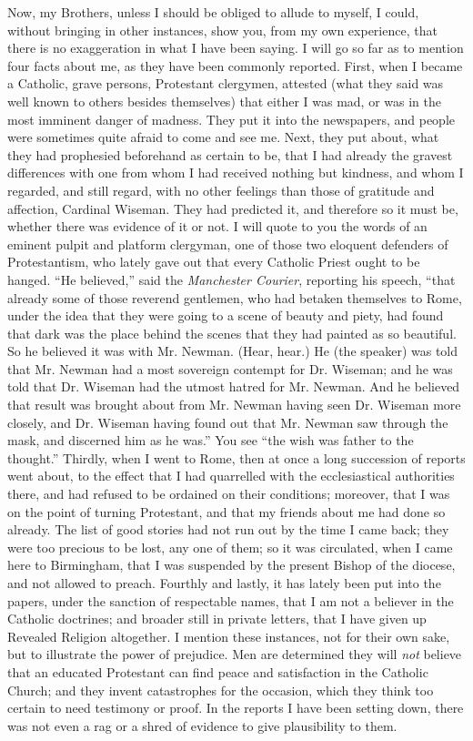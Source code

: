 Now, my Brothers, unless I should be obliged to allude
to myself, I could, without bringing in other instances,
show you, from my own experience, that there is no
exaggeration in what I have been saying. I will go so far
as to mention four facts about me, as they have been
commonly reported. First, when I became a Catholic, grave
persons, Protestant clergymen, attested (what they said
was well known to others besides themselves) that either
I was mad, or was in the most imminent danger of madness.
They put it into the newspapers, and people were
sometimes quite afraid to come and see me. Next, they put
about, what they had prophesied beforehand as certain to
be, that I had already the gravest differences with one
from whom I had received nothing but kindness, and whom I
regarded, and still regard, with no other feelings than
those of gratitude and affection, Cardinal Wiseman. They
had predicted it, and therefore so it must be, whether
there was evidence of it or not. I will quote to you the
words of an eminent pulpit and platform clergyman, one of
those two eloquent defenders of Protestantism, who lately
gave out that every Catholic Priest ought to be hanged.
``He believed,'' said the \emph{Manchester Courier},
reporting his speech, ``that already some of those
reverend gentlemen, who had betaken themselves to Rome,
under the idea that they were going to a scene of beauty
and piety, had found that dark was the place behind the
scenes that they had painted as so beautiful. So he
believed it was with Mr. Newman. (Hear, hear.) He (the
speaker) was told that Mr. Newman had a most sovereign
contempt for Dr. Wiseman; and he was told that Dr.
Wiseman had the utmost hatred for Mr. Newman. And he
believed that result was brought about from Mr. Newman
having seen Dr. Wiseman more closely, and Dr. Wiseman
having found out that Mr. Newman saw through the mask,
and discerned him as he was.'' You see ``the wish
was father to the thought.'' Thirdly, when I went to
Rome, then at once a long succession of reports went
about, to the effect that I had quarrelled with the
ecclesiastical authorities there, and had refused to be
ordained on their conditions; moreover, that I was on the
point of turning Protestant, and that my friends about me
had done so already. The list of good stories had not run
out by the time I came back; they were too precious to be
lost, any one of them; so it was circulated, when I came
here to Birmingham, that I was suspended by the present
Bishop of the diocese, and not allowed to preach.
Fourthly and lastly, it has lately been put into the
papers, under the sanction of respectable names, that I
am not a believer in the Catholic doctrines; and broader
still in private letters, that I have given up Revealed
Religion altogether. I mention these instances, not for
their own sake, but to illustrate the power of prejudice.
Men are determined they will \emph{not} believe that an
educated Protestant can find peace and satisfaction in
the Catholic Church; and they invent catastrophes for the
occasion, which they think too certain to need testimony
or proof. In the reports I have been setting down, there
was not even a rag or a shred of evidence to give
plausibility to them.

